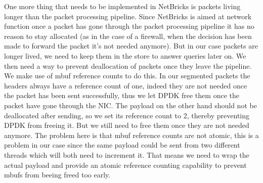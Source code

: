 One more thing that needs to be implemented in NetBricks is packets
living longer than the packet processing pipeline. Since NetBricks is
aimed at network function once a packet has gone through the packet
processing pipeline it has no reason to stay allocated (as in the case
of a firewall, when the decision has been made to forward the packet
it's not needed anymore). But in our case packets are longer lived, we
need to keep them in the store to answer queries later on. We then
need a way to prevent deallocation of packets once they leave the
pipeline. We make use of mbuf reference counts to do this. In our
segmented packets the headers always have a reference count of one,
indeed they are not needed once the packet has been sent successfully,
thus we let DPDK free them once the packet have gone through the
NIC\@. The payload on the other hand should not be deallocated after
sending, so we set its reference count to 2, thereby preventing DPDK
from freeing it. But we still need to free them once they are not
needed anymore. The problem here is that mbuf reference counts are not
atomic, this is a problem in our case since the same payload could be
sent from two different threads which will both need to increment
it. That means we need to wrap the actual payload and provide an
atomic reference counting capability to prevent mbufs from beeing
freed too early.

